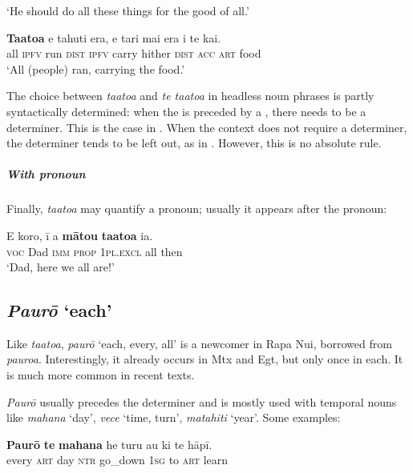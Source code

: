 \glt 
‘He should do all these things for the good of all.’ \textstyleExampleref{[R647.043]} 
\z

\ea\label{ex:4.57}
\gll \textbf{Ta{\ꞌ}ato{\ꞌ}a} e tahuti era, e tari mai era i te kai. \\
all \textsc{ipfv} run \textsc{dist} \textsc{ipfv} carry hither \textsc{dist} \textsc{acc} \textsc{art} food \\

\glt
‘All (people) ran, carrying the food.’ \textstyleExampleref{[R210.155]} 
\z

The choice between \textit{ta{\ꞌ}ato{\ꞌ}a} and \textit{te ta{\ꞌ}ato{\ꞌ}a} in headless noun phrases is partly syntactically determined: when the  is preceded by a , there needs to be a determiner. This is the case in . When the context does not require a determiner, the determiner tends to be left out, as in . However, this is no absolute rule. 

\subparagraph{With pronoun} Finally, \textit{ta{\ꞌ}ato{\ꞌ}a} may quantify a pronoun; usually it appears after the pronoun:

\ea\label{ex:4.58}
\gll E koro, {\ꞌ}ī a \textbf{mātou} \textbf{ta{\ꞌ}ato{\ꞌ}a} ia. \\
\textsc{voc} Dad \textsc{imm} \textsc{prop} \textsc{1pl.excl} all then \\

\glt 
‘Dad, here we all are!’ \textstyleExampleref{[R237.051]} 
\z
{}
\subsection{\textit{Paurō} ‘each’}\label{sec:4.4.3}
Like \textit{ta{\ꞌ}ato{\ꞌ}a}, \textit{paurō} ‘each, every, all’ is a newcomer in Rapa Nui, borrowed from  \textit{pauroa}. Interestingly, it already occurs in Mtx and Egt, but only once in each. It is much more common in recent texts.

\textit{Paurō} usually precedes the determiner and is mostly used with temporal nouns like \textit{mahana} ‘day’, \textit{vece} ‘time, turn’, \textit{matahiti} ‘year’. Some examples:

\ea\label{ex:4.59}
\gll \textbf{Paurō} \textbf{te} \textbf{mahana} he turu au ki te hāpī. \\
every \textsc{art} day \textsc{ntr} go\_down \textsc{1sg} to \textsc{art} learn \\

